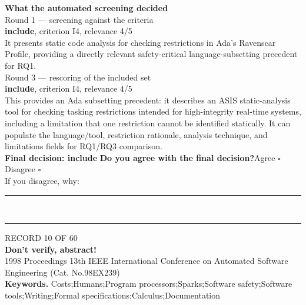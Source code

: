 \documentclass[11pt,a4paper]{article}
\begin{document}
\vspace{3mm}
\vspace{2.5mm}
{\small\textbf{What the automated screening decided}}\\[2mm]
{\footnotesize\color{soft}Round 1 --- screening against the criteria}\\[0.5mm]
{\small\textbf{include}, criterion I4, relevance 4/5}\\[0.5mm]
{\small It presents static code analysis for checking restrictions in Ada's Ravenscar Profile, providing a directly relevant safety-critical language-subsetting precedent for RQ1.}\\[2.5mm]
{\footnotesize\color{soft}Round 3 --- rescoring of the included set}\\[0.5mm]
{\small\textbf{include}, criterion I4, relevance 4/5}\\[0.5mm]
{\small This provides an Ada subsetting precedent: it describes an ASIS static-analysis tool for checking tasking restrictions intended for high-integrity real-time systems, including a limitation that one restriction cannot be identified statically. It can populate the language/tool, restriction rationale, analysis technique, and limitations fields for RQ1/RQ3 comparison.}\\[2.5mm]
{\small\textbf{Final decision: include}}
\vspace{2mm}
{\small\textbf{Do you agree with the final decision?}\quad{}Agree $\square$\qquad{}Disagree $\square$}\\[1mm]
{\footnotesize\color{soft}If you disagree, why:}\\[1mm]
\color{rule}\rule{\linewidth}{0.3pt}\\[3mm]\rule{\linewidth}{0.3pt}\color{black}
\clearpage
{\color{soft}\footnotesize RECORD 10 OF 60}\\[1mm]
{\large\bfseries Don't verify, abstract!}\\[1.5mm]
{\color{soft}\small 1998 \textperiodcentered{} Proceedings 13th IEEE International Conference on Automated Software Engineering (Cat. No.98EX239)}\\[2mm]
{\small\textbf{Keywords.} Costs;Humans;Program processors;Sparks;Software safety;Software tools;Writing;Formal specifications;Calculus;Documentation}\\[2mm]
\end{document}
